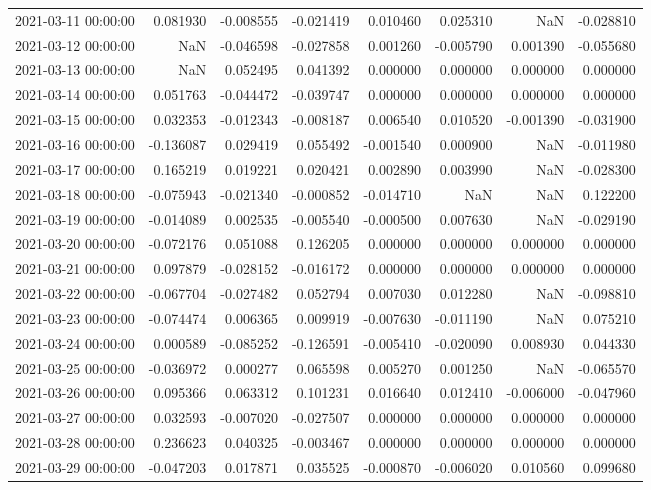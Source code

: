 \begin{tabular}{lrrrrrrr}
2021-03-11 00:00:00 & 0.081930 & -0.008555 & -0.021419 & 0.010460 & 0.025310 & NaN & -0.028810 \\
2021-03-12 00:00:00 & NaN & -0.046598 & -0.027858 & 0.001260 & -0.005790 & 0.001390 & -0.055680 \\
2021-03-13 00:00:00 & NaN & 0.052495 & 0.041392 & 0.000000 & 0.000000 & 0.000000 & 0.000000 \\
2021-03-14 00:00:00 & 0.051763 & -0.044472 & -0.039747 & 0.000000 & 0.000000 & 0.000000 & 0.000000 \\
2021-03-15 00:00:00 & 0.032353 & -0.012343 & -0.008187 & 0.006540 & 0.010520 & -0.001390 & -0.031900 \\
2021-03-16 00:00:00 & -0.136087 & 0.029419 & 0.055492 & -0.001540 & 0.000900 & NaN & -0.011980 \\
2021-03-17 00:00:00 & 0.165219 & 0.019221 & 0.020421 & 0.002890 & 0.003990 & NaN & -0.028300 \\
2021-03-18 00:00:00 & -0.075943 & -0.021340 & -0.000852 & -0.014710 & NaN & NaN & 0.122200 \\
2021-03-19 00:00:00 & -0.014089 & 0.002535 & -0.005540 & -0.000500 & 0.007630 & NaN & -0.029190 \\
2021-03-20 00:00:00 & -0.072176 & 0.051088 & 0.126205 & 0.000000 & 0.000000 & 0.000000 & 0.000000 \\
2021-03-21 00:00:00 & 0.097879 & -0.028152 & -0.016172 & 0.000000 & 0.000000 & 0.000000 & 0.000000 \\
2021-03-22 00:00:00 & -0.067704 & -0.027482 & 0.052794 & 0.007030 & 0.012280 & NaN & -0.098810 \\
2021-03-23 00:00:00 & -0.074474 & 0.006365 & 0.009919 & -0.007630 & -0.011190 & NaN & 0.075210 \\
2021-03-24 00:00:00 & 0.000589 & -0.085252 & -0.126591 & -0.005410 & -0.020090 & 0.008930 & 0.044330 \\
2021-03-25 00:00:00 & -0.036972 & 0.000277 & 0.065598 & 0.005270 & 0.001250 & NaN & -0.065570 \\
2021-03-26 00:00:00 & 0.095366 & 0.063312 & 0.101231 & 0.016640 & 0.012410 & -0.006000 & -0.047960 \\
2021-03-27 00:00:00 & 0.032593 & -0.007020 & -0.027507 & 0.000000 & 0.000000 & 0.000000 & 0.000000 \\
2021-03-28 00:00:00 & 0.236623 & 0.040325 & -0.003467 & 0.000000 & 0.000000 & 0.000000 & 0.000000 \\
2021-03-29 00:00:00 & -0.047203 & 0.017871 & 0.035525 & -0.000870 & -0.006020 & 0.010560 & 0.099680 \\

\end{tabular}
